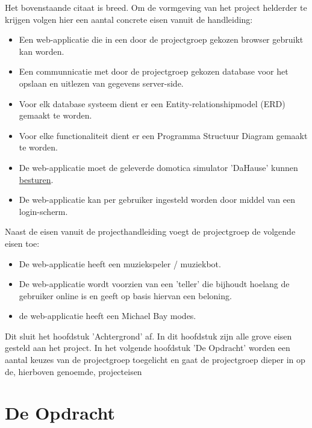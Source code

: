 \documentclass[11pt]{article}
\begin{document}
\begin{flushleft}
	Het bovenstaande citaat is breed. Om de vormgeving van het project helderder te krijgen volgen hier een aantal concrete eisen vanuit de handleiding: 
	\begin{itemize}
		\item Een web-applicatie die in een door de projectgroep gekozen browser gebruikt kan worden.
		\item Een communnicatie met door de projectgroep gekozen database voor het opslaan en uitlezen van gegevens server-side.
		\item Voor elk database systeem dient er een Entity-relationshipmodel (ERD) gemaakt te worden. 
		\item Voor elke functionaliteit dient er een Programma Structuur Diagram gemaakt te worden.
		\item De web-applicatie moet de geleverde domotica simulator 'DaHause' kunnen \underline{besturen}.
		\item De web-applicatie kan per gebruiker ingesteld worden door middel van een login-scherm.  
		\end{itemize}
	\newpage
	Naast de eisen vanuit de projecthandleiding voegt de projectgroep de volgende eisen toe:
	\begin{itemize}
		\item De web-applicatie heeft een muziekspeler / muziekbot.
		\item De web-applicatie wordt voorzien van een 'teller' die bijhoudt hoelang de gebruiker online is en geeft op basis hiervan een beloning.
		\item de web-applicatie heeft een Michael Bay modes.
	\end{itemize}
	\end{flushleft}

\begin{flushleft}
	Dit sluit het hoofdstuk 'Achtergrond' af. In dit hoofdstuk zijn alle grove eisen gesteld aan het project. In het volgende hoofdstuk 'De Opdracht' worden
	een aantal keuzes van de projectgroep toegelicht en gaat de projectgroep dieper in op de, hierboven genoemde, projecteisen
\end{flushleft}



\newpage
\section{De Opdracht}
\end{document}
